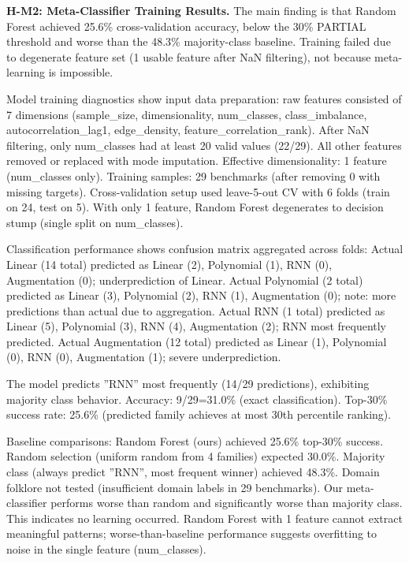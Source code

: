 \textbf{H-M2: Meta-Classifier Training Results.} The main finding is that Random Forest achieved 25.6\% cross-validation accuracy, below the 30\% PARTIAL threshold and worse than the 48.3\% majority-class baseline. Training failed due to degenerate feature set (1 usable feature after NaN filtering), not because meta-learning is impossible.

Model training diagnostics show input data preparation: raw features consisted of 7 dimensions (sample\_size, dimensionality, num\_classes, class\_imbalance, autocorrelation\_lag1, edge\_density, feature\_correlation\_rank). After NaN filtering, only num\_classes had at least 20 valid values (22/29). All other features removed or replaced with mode imputation. Effective dimensionality: 1 feature (num\_classes only). Training samples: 29 benchmarks (after removing 0 with missing targets). Cross-validation setup used leave-5-out CV with 6 folds (train on 24, test on 5). With only 1 feature, Random Forest degenerates to decision stump (single split on num\_classes).

Classification performance shows confusion matrix aggregated across folds: Actual Linear (14 total) predicted as Linear (2), Polynomial (1), RNN (0), Augmentation (0); underprediction of Linear. Actual Polynomial (2 total) predicted as Linear (3), Polynomial (2), RNN (1), Augmentation (0); note: more predictions than actual due to aggregation. Actual RNN (1 total) predicted as Linear (5), Polynomial (3), RNN (4), Augmentation (2); RNN most frequently predicted. Actual Augmentation (12 total) predicted as Linear (1), Polynomial (0), RNN (0), Augmentation (1); severe underprediction.

The model predicts ''RNN'' most frequently (14/29 predictions), exhibiting majority class behavior. Accuracy: 9/29=31.0\% (exact classification). Top-30\% success rate: 25.6\% (predicted family achieves at most 30th percentile ranking).

Baseline comparisons: Random Forest (ours) achieved 25.6\% top-30\% success. Random selection (uniform random from 4 families) expected 30.0\%. Majority class (always predict ''RNN'', most frequent winner) achieved 48.3\%. Domain folklore not tested (insufficient domain labels in 29 benchmarks). Our meta-classifier performs worse than random and significantly worse than majority class. This indicates no learning occurred. Random Forest with 1 feature cannot extract meaningful patterns; worse-than-baseline performance suggests overfitting to noise in the single feature (num\_classes).

